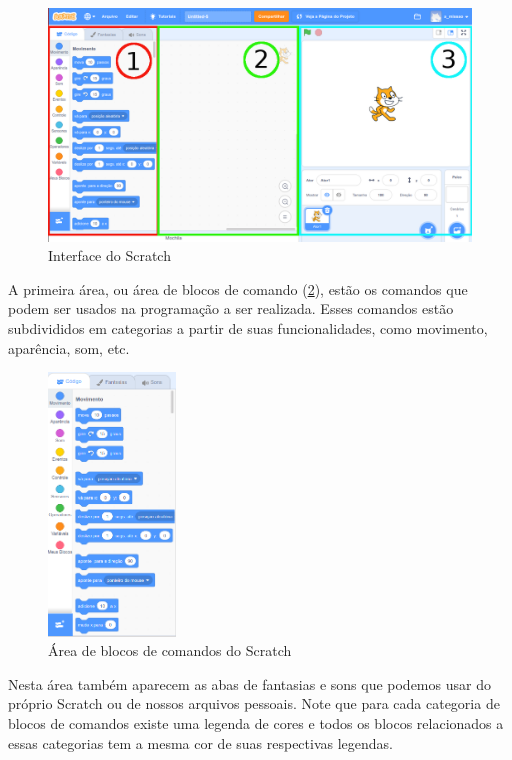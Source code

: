\documentclass[12pt, openright, a4paper, brazil, english, french, spanish, bibjustif, openany, oneside]{abntex2}
\begin{document}
\begin{figure}[h]

    \center

    \includegraphics[width=15cm]{scratch1.png}
    \caption{Interface do Scratch \label{scr1}}
    
\end{figure}

\newpage

A primeira área, ou área de blocos de comando (\ref{scr2}), estão os comandos que podem ser usados na programação a ser realizada. Esses comandos estão subdivididos em categorias a partir de suas funcionalidades, como movimento, aparência, som, etc.

\begin{figure}[h]

    \center

    \includegraphics[height=7cm]{scratch2.png}
    \caption{Área de blocos de comandos do Scratch \label{scr2}}
    
\end{figure}

Nesta área também aparecem as abas de fantasias e sons que podemos usar do próprio Scratch ou de nossos arquivos pessoais. Note que para cada categoria de blocos de comandos existe uma legenda de cores e todos os blocos relacionados a essas categorias tem a mesma cor de suas respectivas legendas.
\end{document}
